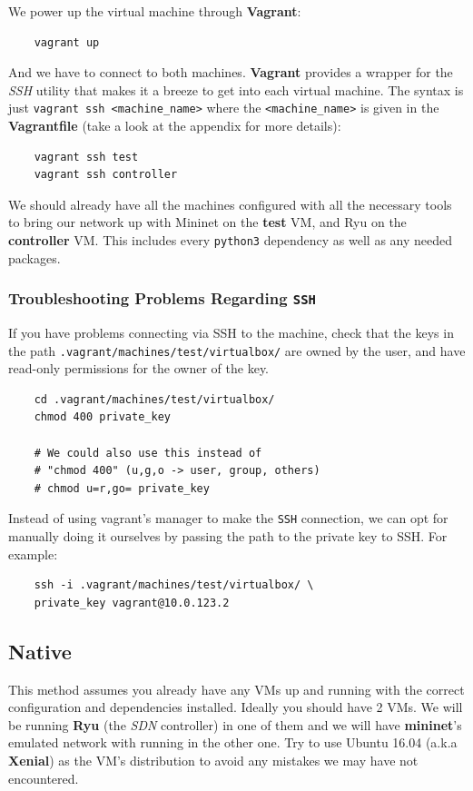 \documentclass[12pt]{article}
\begin{document}
		We power up the virtual machine through \textbf{Vagrant}:

		\begin{verbatim}
	vagrant up
		\end{verbatim}

		And we have to connect to both machines. \textbf{Vagrant} provides a wrapper for the \textit{SSH} utility that makes it a breeze to get into each virtual machine. The syntax is just \texttt{vagrant ssh <machine\_name>} where the \texttt{<machine\_name>} is given in the \textbf{Vagrantfile} (take a look at the appendix for more details):

		\begin{verbatim}
	vagrant ssh test
	vagrant ssh controller
		\end{verbatim}

		We should already have all the machines configured with all the necessary tools to bring our network up with Mininet on the \textbf{test} VM, and Ryu on the \textbf{controller} VM. This includes every \texttt{python3} dependency as well as any needed packages.

		\subsubsection{Troubleshooting Problems Regarding \texttt{SSH}}
			If you have problems connecting via SSH to the machine, check that the keys in the path \texttt{.vagrant/machines/test/virtualbox/} are owned by the user, and have read-only permissions for the owner of the key. 

			\begin{verbatim}
	cd .vagrant/machines/test/virtualbox/
	chmod 400 private_key

	# We could also use this instead of
	# "chmod 400" (u,g,o -> user, group, others)
	# chmod u=r,go= private_key
			\end{verbatim}

			Instead of using vagrant's manager to make the \texttt{SSH} connection, we can opt for manually doing it ourselves by passing the path to the private key to SSH. For example:

			\begin{verbatim}
	ssh -i .vagrant/machines/test/virtualbox/ \
	private_key vagrant@10.0.123.2
			\end{verbatim}

	\subsection{Native}
		This method assumes you already have any VMs up and running with the correct configuration and dependencies installed. Ideally you should have 2 VMs. We will be running \textbf{Ryu} (the \textit{SDN} controller) in one of them and we will have \textbf{mininet}'s emulated network with running in the other one. Try to use Ubuntu 16.04 (a.k.a \textbf{Xenial}) as the VM's distribution to avoid any mistakes we may have not encountered.
\end{document}
